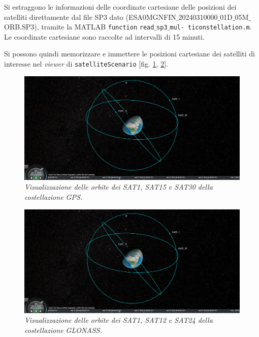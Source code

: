 \documentclass[a4paper,11pt,twoside]{book}
\begin{document}
	Si estraggono le informazioni delle coordinate cartesiane delle posizioni dei satelliti direttamente dal file SP3 dato (ESA0MGNFIN$\_$20240310000$\_$01D$\_$05M$\_$ORB.SP3), tramite la MATLAB \texttt{function} \texttt{read$\_$sp3$\_$mul- ticonstellation.m}. Le coordinate cartesiane sono raccolte ad intervalli di 15 minuti.
	
	Si possono quindi memorizzare e immettere le posizioni cartesiane dei satelliti di interesse nel \textit{viewer} di \texttt{satelliteScenario} [fig. \ref{sp3gps}, \ref{sp3glo}].
	
	\begin{figure}[H]
		\centering
		\includegraphics[scale=0.27]{"Immagini workbook/Immagini esp2/gpssp31"}
		\caption{\textit{Visualizzazione delle orbite dei SAT1, SAT15 e SAT30 della costellazione GPS.}}
		\label{sp3gps}
	\end{figure}

	\begin{figure}[H]
		\centering
		\includegraphics[scale=0.27]{"Immagini workbook/Immagini esp2/gpssp31"}
		\caption{\textit{Visualizzazione delle orbite dei SAT1, SAT12 e SAT24 della costellazione GLONASS.}}
		\label{sp3glo}
	\end{figure}
	
	
	
\end{document}
